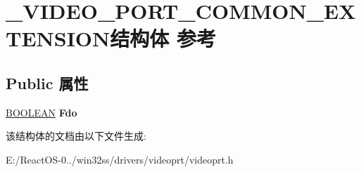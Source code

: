 \hypertarget{struct___v_i_d_e_o___p_o_r_t___c_o_m_m_o_n___e_x_t_e_n_s_i_o_n}{}\section{\+\_\+\+V\+I\+D\+E\+O\+\_\+\+P\+O\+R\+T\+\_\+\+C\+O\+M\+M\+O\+N\+\_\+\+E\+X\+T\+E\+N\+S\+I\+O\+N结构体 参考}
\label{struct___v_i_d_e_o___p_o_r_t___c_o_m_m_o_n___e_x_t_e_n_s_i_o_n}
\subsection*{Public 属性}
\begin{DoxyCompactItemize}
\item 
\mbox{\label{struct___v_i_d_e_o___p_o_r_t___c_o_m_m_o_n___e_x_t_e_n_s_i_o_n_aa577f6975b92f926d56e9b75f1a5718d}} 
\hyperlink{_processor_bind_8h_a112e3146cb38b6ee95e64d85842e380a}{B\+O\+O\+L\+E\+AN} {\bfseries Fdo}
\end{DoxyCompactItemize}


该结构体的文档由以下文件生成\+:\begin{DoxyCompactItemize}
\item 
E\+:/\+React\+O\+S-\/0../win32ss/drivers/videoprt/videoprt.\+h\end{DoxyCompactItemize}
